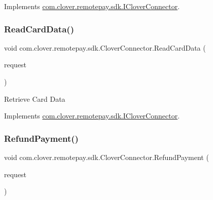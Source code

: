 Implements \hyperlink{interfacecom_1_1clover_1_1remotepay_1_1sdk_1_1_i_clover_connector_a16a2a91c231e7a66373b2c0e2f612951}{com.\+clover.\+remotepay.\+sdk.\+I\+Clover\+Connector}.

\mbox{\label{classcom_1_1clover_1_1remotepay_1_1sdk_1_1_clover_connector_a0901566c92bbce70865b3ae144e42cdc}} 
\subsubsection{\texorpdfstring{Read\+Card\+Data()}{ReadCardData()}}
{\footnotesize\ttfamily void com.\+clover.\+remotepay.\+sdk.\+Clover\+Connector.\+Read\+Card\+Data (\begin{DoxyParamCaption}\item[{\hyperlink{classcom_1_1clover_1_1remotepay_1_1sdk_1_1_read_card_data_request}{Read\+Card\+Data\+Request}}]{request }\end{DoxyParamCaption})}



Retrieve Card Data 



Implements \hyperlink{interfacecom_1_1clover_1_1remotepay_1_1sdk_1_1_i_clover_connector_a841db6225c6a5df5e04918d9e2648fd1}{com.\+clover.\+remotepay.\+sdk.\+I\+Clover\+Connector}.

\mbox{\label{classcom_1_1clover_1_1remotepay_1_1sdk_1_1_clover_connector_a55f368cbaa89e2a8c47da3ba4a3a80aa}} 
\subsubsection{\texorpdfstring{Refund\+Payment()}{RefundPayment()}}
{\footnotesize\ttfamily void com.\+clover.\+remotepay.\+sdk.\+Clover\+Connector.\+Refund\+Payment (\begin{DoxyParamCaption}\item[{\hyperlink{classcom_1_1clover_1_1remotepay_1_1sdk_1_1_refund_payment_request}{Refund\+Payment\+Request}}]{request }\end{DoxyParamCaption})}



